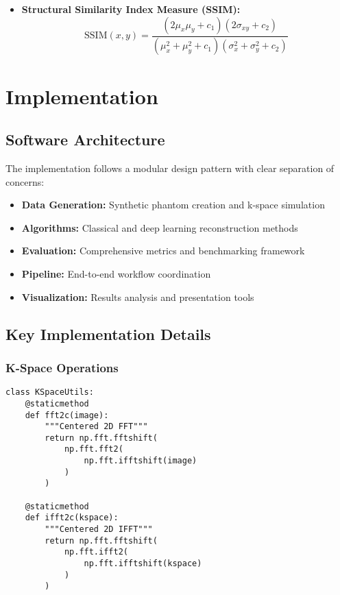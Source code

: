 \documentclass[11pt,a4paper]{article}
\begin{document}
\begin{itemize}
    \item \textbf{Structural Similarity Index Measure (SSIM):}
    \begin{equation}
    \text{SSIM}(x,y) = \frac{(2\mu_x\mu_y + c_1)(2\sigma_{xy} + c_2)}{(\mu_x^2 + \mu_y^2 + c_1)(\sigma_x^2 + \sigma_y^2 + c_2)}
    \end{equation}
\end{itemize}

\section{Implementation}

\subsection{Software Architecture}

The implementation follows a modular design pattern with clear separation of concerns:

\begin{itemize}
    \item \textbf{Data Generation:} Synthetic phantom creation and k-space simulation
    \item \textbf{Algorithms:} Classical and deep learning reconstruction methods
    \item \textbf{Evaluation:} Comprehensive metrics and benchmarking framework
    \item \textbf{Pipeline:} End-to-end workflow coordination
    \item \textbf{Visualization:} Results analysis and presentation tools
\end{itemize}

\subsection{Key Implementation Details}

\subsubsection{K-Space Operations}

\begin{lstlisting}[caption=K-Space Utilities Implementation]
class KSpaceUtils:
    @staticmethod
    def fft2c(image):
        """Centered 2D FFT"""
        return np.fft.fftshift(
            np.fft.fft2(
                np.fft.ifftshift(image)
            )
        )
    
    @staticmethod
    def ifft2c(kspace):
        """Centered 2D IFFT"""
        return np.fft.fftshift(
            np.fft.ifft2(
                np.fft.ifftshift(kspace)
            )
        )
\end{lstlisting}
\end{document}
